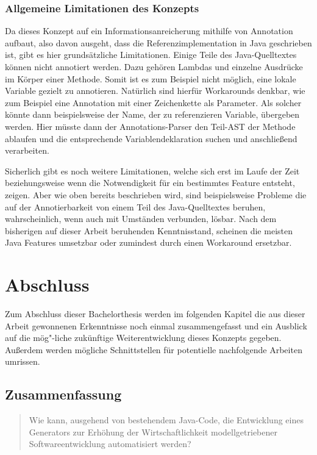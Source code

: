 \documentclass[12pt,oneside,a4paper,parskip]{scrbook}
\begin{document}
\subsection{Allgemeine Limitationen des Konzepts}

Da dieses Konzept auf ein Informationsanreicherung mithilfe von Annotation aufbaut, also davon ausgeht, dass die Referenzimplementation in Java geschrieben ist, gibt es hier grundsätzliche Limitationen. Einige Teile des Java-Quelltextes können nicht annotiert werden. Dazu gehören Lambdas und einzelne Ausdrücke im Körper einer Methode. Somit ist es zum Beispiel nicht möglich, eine lokale Variable gezielt zu annotieren. Natürlich sind hierfür Workarounds denkbar, wie zum Beispiel eine Annotation mit einer Zeichenkette als Parameter. Als solcher könnte dann beispielsweise der Name, der zu referenzieren Variable, übergeben werden. Hier müsste dann der Annotations-Parser den Teil-AST der Methode ablaufen und die entsprechende Variablendeklaration suchen und anschließend verarbeiten.

Sicherlich gibt es noch weitere Limitationen, welche sich erst im Laufe der Zeit beziehungsweise wenn die Notwendigkeit für ein bestimmtes Feature entsteht, zeigen. Aber wie oben bereits beschrieben wird, sind beispielsweise Probleme die auf der Annotierbarkeit von einem Teil des Java-Quelltextes beruhen, wahrscheinlich, wenn auch mit Umständen verbunden, lösbar. Nach dem bisherigen auf dieser Arbeit beruhenden Kenntnisstand, scheinen die meisten Java Features umsetzbar oder zumindest durch einen Workaround ersetzbar.

\chapter{Abschluss}

Zum Abschluss dieser Bachelorthesis werden im folgenden Kapitel die aus dieser Arbeit gewonnenen Erkenntnisse noch einmal zusammengefasst und ein Ausblick auf die mög"-liche zukünftige Weiterentwicklung dieses Konzepts gegeben. Außerdem werden mögliche Schnittstellen für potentielle nachfolgende Arbeiten umrissen.

\section{Zusammenfassung}

\begin{quote}\glqq Wie kann, ausgehend von bestehendem Java-Code, die Entwicklung eines Generators zur Erhöhung der Wirtschaftlichkeit modellgetriebener Softwareentwicklung automatisiert werden?\grqq \end{quote}
\end{document}
